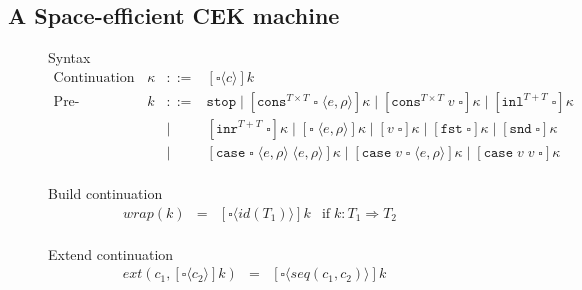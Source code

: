 \documentclass[acmsmall,review,anonymous]{acmart}\settopmatter{printfolios=true,printccs=false,printacmref=false}
\newcommand{\stxrule}[3]{\text{#2} & #1 & ::= & #3\\}
\newcommand{\stxrulecont}[1]{& & | & #1 \\}
\newcommand{\funrule}[3]{#1 &=& #2 & #3\\}
\newcommand{\plus}[0]{+}
\newcommand{\sOOinspect}[3]{\langle#1,#2,#3\rangle}
\newcommand{\sOOreturn}[2]{\langle#1,#2\rangle}
\newcommand{\sOOhalt}[1]{\mathtt{Halt} \; #1}
\newcommand{\POOprod}[2]{#1 \times #2}
\newcommand{\POOsum}[2]{#1 \plus #2}
\newcommand{\rOOsucc}[1]{\mathtt{succ}\;#1}
\newcommand{\rOOfail}[1]{\mathtt{fail}\;#1}
\newcommand{\kOOmt}[0]{\mathtt{stop}}
\newcommand{\kOOconsI}[5]{
	[\mathtt{cons}^{\POOprod{#1}{#2}} \; \square \; \langle#3,#4\rangle ]#5}
\newcommand{\kOOconsII}[4]{
	[\mathtt{cons}^{\POOprod{#1}{#2}} \; #3 \; \square]#4}
\newcommand{\kOOinl}[3]{[\mathtt{inl}^{\POOsum{#1}{#2}}\; \square]#3}
\newcommand{\kOOinr}[3]{[\mathtt{inr}^{\POOsum{#1}{#2}}\; \square]#3}
\newcommand{\kOOappI}[3]{
  [\square \; \langle#1,#2\rangle]#3
}
\newcommand{\kOOappII}[2]{
  [#1 \; \square]#2}
\newcommand{\kOOcar}[1]{[\mathtt{fst} \; \square]#1}
\newcommand{\kOOcdr}[1]{[\mathtt{snd} \; \square]#1}
\newcommand{\kOOcaseI}[4]{
  [\mathtt{case} \; \square \; \langle#1,#3\rangle \; \langle#2,#3\rangle ]#4}
\newcommand{\kOOcaseII}[4]{
  [\mathtt{case} \; #1 \; \square \; \langle#2,#3\rangle ]#4}
\newcommand{\kOOcaseIII}[3]{
  [\mathtt{case} \; #1 \; #2 \; \square]#3}
\newcommand{\kOOcast}[2]{
  [\square \langle #1 \rangle]#2}
\newcommand{\sidecond}[1]{\text{if}\;#1}
\newcommand{\ineffCEKD}{$\mathcal{D}$}
\begin{document}

\subsection{A Space-efficient CEK machine}
\label{sec:framework:cek}

\begin{figure}
  Syntax
  \[
  \begin{array}{lrcl}
  \stxrule{\kappa}{Continuation}{
    \kOOcast{c}{k}
  }
  \stxrule{k}{Pre-continuations}{
    \kOOmt \mid{}
    \kOOconsI{T}{T}{e}{\rho}{\kappa} \mid
    \kOOconsII{T}{T}{v}{\kappa} \mid
    \kOOinl{T}{T}{\kappa}
  }
  \stxrulecont{
  	\kOOinr{T}{T}{\kappa} \mid
    \kOOappI{e}{\rho}{\kappa} \mid
    \kOOappII{v}{\kappa} \mid
    \kOOcar{\kappa} \mid
    \kOOcdr{\kappa}
  }
  \stxrulecont{
    \kOOcaseI{e}{e}{\rho}{\kappa} \mid
    \kOOcaseII{v}{e}{\rho}{\kappa} \mid
    \kOOcaseIII{v}{v}{\kappa}
  }
  \end{array}
  \]
  
  Build continuation 
  \[
  \begin{array}{rclc}
  \funrule{wrap(k)}{\kOOcast{id(T_1)}{k}}{
    \sidecond{k : T_1 \Longrightarrow T_2}}
  \end{array}
  \]
  
  Extend continuation 
  \[
  \begin{array}{rclc}
  \funrule{ext(c_1,\kOOcast{c_2}{k})}{
    \kOOcast{seq(c_1,c_2)}{k}
  }{}
  \end{array}
  \]


\end{figure}
\end{document}
